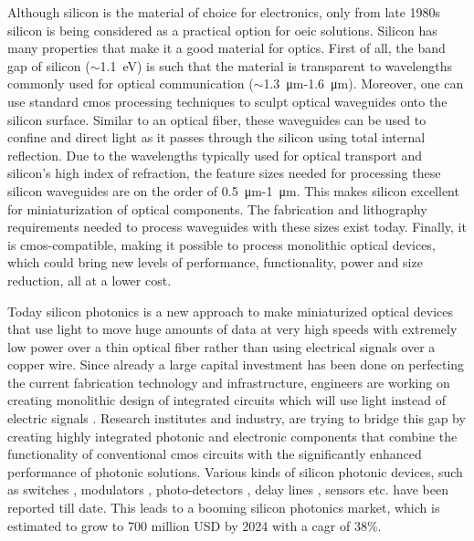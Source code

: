 \documentclass[../report.tex]{subfiles}
\begin{document}
Although silicon is the material of choice for electronics, only from late 1980s silicon is being considered as a practical option for \gls{oeic} solutions. Silicon has many properties that make it a good material for optics. First of all, the band gap of silicon ($\sim$\SI{1.1}{\electronvolt}) is such that the material is transparent to wavelengths commonly used for optical communication ($\sim$\SI{1.3}{\micro\metre}-\SI{1.6}{\micro\metre}). Moreover, one can use standard \gls{cmos} processing techniques to sculpt optical waveguides onto the silicon surface. Similar to an optical fiber, these waveguides can be used to confine and direct light as it passes through the silicon \cite{reed_silicon_2004} using total internal reflection. Due to the wavelengths typically used for optical transport and silicon’s high index of refraction, the feature sizes needed for processing these silicon waveguides are on the order of \SI{0.5}{\micro\metre}-\SI{1}{\micro\metre}. This makes silicon excellent for miniaturization of optical components. The fabrication and lithography requirements needed to process waveguides with these sizes exist today. Finally, it is \gls{cmos}-compatible, making it possible to process monolithic optical devices, which could bring new levels of performance, functionality, power and size reduction, all at a lower cost. \par

Today silicon photonics is a new approach to make miniaturized optical devices that use light to move huge amounts of data at very high speeds with extremely low power over a thin optical fiber rather than using electrical signals over a copper wire. Since already a large capital investment has been done on perfecting the current fabrication technology and infrastructure, engineers are working on creating monolithic design of integrated circuits which will use light instead of electric signals \cite{optical_linking}. Research institutes and industry, are trying to bridge this gap by creating highly integrated photonic and electronic components that combine the functionality of conventional \gls{cmos} circuits with the significantly enhanced performance of photonic solutions. Various kinds of silicon photonic devices, such as switches \cite{stabile_integrated_2016,wu_mems-enabled_2015,nikolova_scaling_2015,lu_low-power_2014}, modulators \cite{dong_silicon_2015,chen_generation_2013}, photo-detectors \cite{urino_demonstration_2012,chang_high-power_2015}, delay lines \cite{garcia_design_2015,mattarei_variable_2014}, sensors \cite{janz_silicon_2007,lim_laser_2010,ryckeboer_glucose_2014} etc. have been reported till date. This leads to a booming silicon photonics market, which is estimated to grow to 700 million USD by 2024 \cite{jalali_silicon_2006,silicon_photonics_growth_2015} with a \gls{cagr} of 38\%. 
\end{document}
